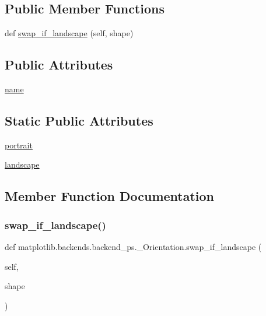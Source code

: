 \subsection*{Public Member Functions}
\begin{DoxyCompactItemize}
\item 
def \hyperlink{classmatplotlib_1_1backends_1_1backend__ps_1_1__Orientation_a6781c13f64d8846eaee26587f796bc2a}{swap\+\_\+if\+\_\+landscape} (self, shape)
\end{DoxyCompactItemize}
\subsection*{Public Attributes}
\begin{DoxyCompactItemize}
\item 
\hyperlink{classmatplotlib_1_1backends_1_1backend__ps_1_1__Orientation_ae7de3eb0aa21b837dda8c718067fbca0}{name}
\end{DoxyCompactItemize}
\subsection*{Static Public Attributes}
\begin{DoxyCompactItemize}
\item 
\hyperlink{classmatplotlib_1_1backends_1_1backend__ps_1_1__Orientation_a64127f7fd7092685276eaf00a23d253a}{portrait}
\item 
\hyperlink{classmatplotlib_1_1backends_1_1backend__ps_1_1__Orientation_ae1f14dc13775e0fb88de67f44b0feed6}{landscape}
\end{DoxyCompactItemize}


\subsection{Member Function Documentation}
\mbox{\label{classmatplotlib_1_1backends_1_1backend__ps_1_1__Orientation_a6781c13f64d8846eaee26587f796bc2a}} 
\subsubsection{\texorpdfstring{swap\+\_\+if\+\_\+landscape()}{swap\_if\_landscape()}}
{\footnotesize\ttfamily def matplotlib.\+backends.\+backend\+\_\+ps.\+\_\+\+Orientation.\+swap\+\_\+if\+\_\+landscape (\begin{DoxyParamCaption}\item[{}]{self,  }\item[{}]{shape }\end{DoxyParamCaption})}



